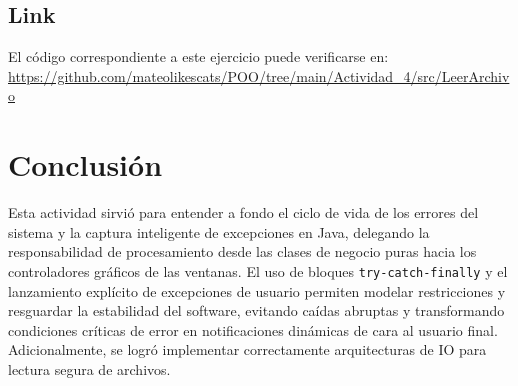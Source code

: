 \documentclass[a4paper,11pt]{article}
\begin{document}
\subsection{Link}
El código correspondiente a este ejercicio puede verificarse en:
\url{https://github.com/mateolikescats/POO/tree/main/Actividad_4/src/LeerArchivo}

\newpage

\section{Conclusión}
Esta actividad sirvió para entender a fondo el ciclo de vida de los errores del sistema y la captura inteligente de excepciones en Java, delegando la responsabilidad de procesamiento desde las clases de negocio puras hacia los controladores gráficos de las ventanas. El uso de bloques \texttt{try-catch-finally} y el lanzamiento explícito de excepciones de usuario permiten modelar restricciones y resguardar la estabilidad del software, evitando caídas abruptas y transformando condiciones críticas de error en notificaciones dinámicas de cara al usuario final. Adicionalmente, se logró implementar correctamente arquitecturas de IO para lectura segura de archivos.
\end{document}
